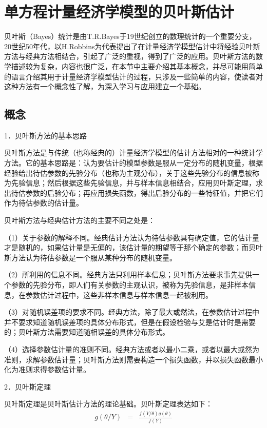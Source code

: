 \section{单方程计量经济学模型的贝叶斯估计}

	贝叶斯（Bayes）统计是由T.R.Bayes于19世纪创立的数理统计的一个重要分支，20世纪50年代，以H.Robbins为代表提出了在计量经济学模型估计中将经验贝叶斯方法与经典方法相结合，引起了广泛的重视，得到了广泛的应用。贝叶斯方法的数学描述较为复杂，内容也很广泛，在本节中主要介绍其基本概念，并尽可能用简单的语言介绍其用于计量经济学模型估计的过程，只涉及一些简单的内容，使读者对这种方法有一个概念性了解，为深入学习与应用建立一个基础。
	
	\subsection{概念}
	
		1．贝叶斯方法的基本思路
		
		贝叶斯方法是与传统（也称经典的）计量经济学模型的估计方法相对的一种统计学方法。它的基本思路是：认为要估计的模型参数是服从一定分布的随机变量，根据经验给出待估参数的先验分布（也称为主观分布），关于这些先验分布的信息被称为先验信息；然后根据这些先验信息，并与样本信息相结合，应用贝叶斯定理，求出待估参数的后验分布；再应用损失函数，得出后验分布的一些特征值，并把它们作为待估参数的估计量。
		
		贝叶斯方法与经典估计方法的主要不同之处是：
		
		（1）关于参数的解释不同。经典估计方法认为待估参数具有确定值，它的估计量才是随机的，如果估计量是无偏的，该估计量的期望等于那个确定的参数；而贝叶斯方法认为待估参数是一个服从某种分布的随机变量。
		
		（2）所利用的信息不同。经典方法只利用样本信息；贝叶斯方法要求事先提供一个参数的先验分布，即人们有关参数的主观认识，被称为先验信息，是非样本信息，在参数估计过程中，这些非样本信息与样本信息一起被利用。
		
		（3）对随机误差项的要求不同。经典方法，除了最大或然法，在参数估计过程中并不要求知道随机误差项的具体分布形式，但是在假设检验与艾是估计时是需要的；贝叶斯方法需要知道随相误差的具体分布形式。
		
		（4）选择参数估计量的准则不同。经典方法或者以最小二乘，或者以最大或然为准则，求解参数估计量；贝叶斯方法则需要构造一个损失函数，并以损失函数最小化为准则求得参数估计量。
		
		2．贝叶斯定理
		
		贝叶斯定理是贝叶斯估计方法的理论基础。贝叶斯定理表达如下：
		\begin{eqnarray}
		g(\theta / Y) & = & \frac{f(Y / \theta) g(\theta)}{f(Y)}
		\label{eq 3.4.1}
		\end{eqnarray}
		
